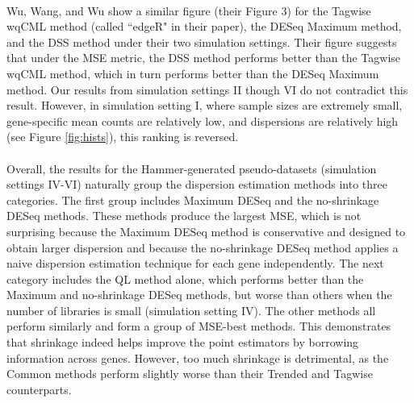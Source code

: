 \documentclass[10pt]{article}
\begin{document}
 
 
 
 
 {
\paragraph{} \indent Wu, Wang, and Wu \cite{dss} show a similar figure (their Figure 3) for the Tagwise wqCML method (called ``edgeR" in their paper), the DESeq Maximum method, and the DSS method under their two simulation settings. Their figure suggests that under the MSE metric, the DSS method performs better than the Tagwise wqCML method, which in turn performs better than the DESeq Maximum method. Our results from simulation settings II though VI do not contradict this result. However, in simulation setting I, where sample sizes are extremely small, gene-specific mean counts are relatively low, and dispersions are relatively high (see Figure \ref{fig:hists}), this ranking is reversed.}






\paragraph{} \indent Overall, the results for the Hammer-generated pseudo-datasets (simulation settings IV-VI) naturally group the dispersion estimation methods into three categories. The first group includes Maximum DESeq and the no-shrinkage DESeq methods. These methods produce the largest MSE, which is not surprising because the Maximum DESeq method is conservative and designed to obtain larger dispersion and because the no-shrinkage DESeq method applies a naive dispersion estimation technique for each gene independently. The next category includes the QL method alone, which performs better than the Maximum and no-shrinkage DESeq methods, but worse than others when the number of libraries is small (simulation setting IV). The other methods all perform similarly and form a group of MSE-best methods. This demonstrates that shrinkage indeed helps improve the point estimators by borrowing information across genes. However, too much shrinkage is detrimental, as the Common methods perform %
slightly worse than their Trended and Tagwise counterparts.
\end{document}
